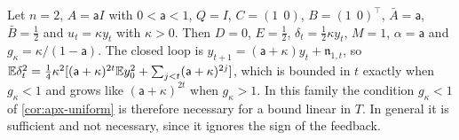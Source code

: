 \begin{remark}\label{rem:apx-smallgain}
Let $n=2$, $A=\mathsf aI$ with $0<\mathsf a<1$, $Q=I$, $C=(1\ \ 0)$, $B=(1\ \ 0)^\top$, $\bar A=\mathsf a$, $\bar B=\frac12$ and $u_t=\kappa y_t$ with $\kappa>0$. Then $D=0$, $E=\frac12$, $\delta_t=\frac12\kappa y_t$, $M=1$, $\alpha=\mathsf a$ and $g_\kappa=\kappa/(1-\mathsf a)$. The closed loop is $y_{t+1}=(\mathsf a+\kappa)y_t+\mathfrak n_{1,t}$, so $\mathbb{E}\delta_t^2=\frac14\kappa^2[(\mathsf a+\kappa)^{2t}\mathbb{E} y_0^2+\sum_{j<t}(\mathsf a+\kappa)^{2j}]$, which is bounded in $t$ exactly when $g_\kappa<1$ and grows like $(\mathsf a+\kappa)^{2t}$ when $g_\kappa>1$. In this family the condition $g_\kappa<1$ of \cref{cor:apx-uniform} is therefore necessary for a bound linear in $T$. In general it is sufficient and not necessary, since it ignores the sign of the feedback.
\end{remark}

